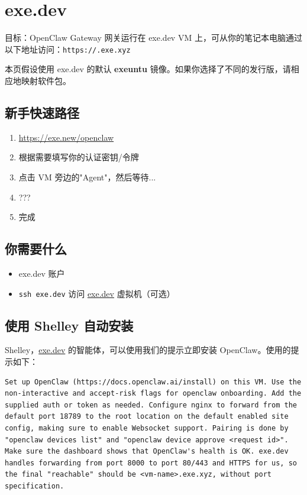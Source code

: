 \clearpage

\section{exe.dev}


目标：OpenClaw Gateway 网关运行在 exe.dev VM 上，可从你的笔记本电脑通过以下地址访问：\texttt{https://.exe.xyz}

本页假设使用 exe.dev 的默认 \textbf{exeuntu} 镜像。如果你选择了不同的发行版，请相应地映射软件包。

\subsection{新手快速路径}


\begin{enumerate}
  \item \href{https://exe.new/openclaw}{https://exe.new/openclaw}
  \item 根据需要填写你的认证密钥/令牌
  \item 点击 VM 旁边的"Agent"，然后等待...
  \item ???
  \item 完成
\end{enumerate}


\subsection{你需要什么}


\begin{itemize}
  \item exe.dev 账户
  \item \texttt{ssh exe.dev} 访问 \href{https://exe.dev}{exe.dev} 虚拟机（可选）
\end{itemize}


\subsection{使用 Shelley 自动安装}


Shelley，\href{https://exe.dev}{exe.dev} 的智能体，可以使用我们的提示立即安装 OpenClaw。使用的提示如下：

\begin{lstlisting}
Set up OpenClaw (https://docs.openclaw.ai/install) on this VM. Use the non-interactive and accept-risk flags for openclaw onboarding. Add the supplied auth or token as needed. Configure nginx to forward from the default port 18789 to the root location on the default enabled site config, making sure to enable Websocket support. Pairing is done by "openclaw devices list" and "openclaw device approve <request id>". Make sure the dashboard shows that OpenClaw's health is OK. exe.dev handles forwarding from port 8000 to port 80/443 and HTTPS for us, so the final "reachable" should be <vm-name>.exe.xyz, without port specification.
\end{lstlisting}


